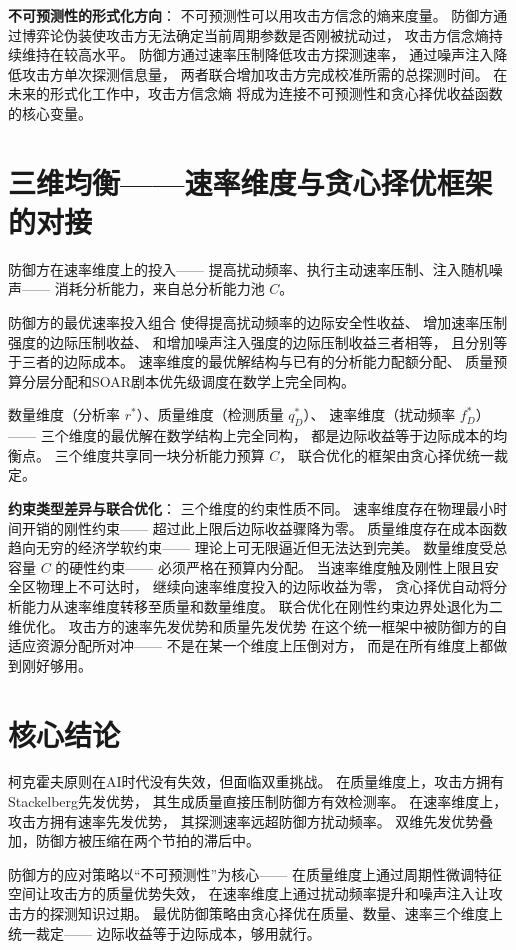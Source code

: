 \documentclass[11pt,a4paper]{article}
\begin{document}
\textbf{不可预测性的形式化方向}：
不可预测性可以用攻击方信念的熵来度量。
防御方通过博弈论伪装使攻击方无法确定当前周期参数是否刚被扰动过，
攻击方信念熵持续维持在较高水平。
防御方通过速率压制降低攻击方探测速率，
通过噪声注入降低攻击方单次探测信息量，
两者联合增加攻击方完成校准所需的总探测时间。
在未来的形式化工作中，攻击方信念熵
将成为连接不可预测性和贪心择优收益函数的核心变量。

\section{三维均衡——速率维度与贪心择优框架的对接}

防御方在速率维度上的投入——
提高扰动频率、执行主动速率压制、注入随机噪声——
消耗分析能力，来自总分析能力池 \(C\)。

防御方的最优速率投入组合
使得提高扰动频率的边际安全性收益、
增加速率压制强度的边际压制收益、
和增加噪声注入强度的边际压制收益三者相等，
且分别等于三者的边际成本。
速率维度的最优解结构与已有的分析能力配额分配、
质量预算分层分配和SOAR剧本优先级调度在数学上完全同构。

数量维度（分析率 \(r^*\)）、质量维度（检测质量 \(q_D^*\)）、
速率维度（扰动频率 \(f_D^*\)）——
三个维度的最优解在数学结构上完全同构，
都是边际收益等于边际成本的均衡点。
三个维度共享同一块分析能力预算 \(C\)，
联合优化的框架由贪心择优统一裁定。

\textbf{约束类型差异与联合优化}：
三个维度的约束性质不同。
速率维度存在物理最小时间开销的刚性约束——
超过此上限后边际收益骤降为零。
质量维度存在成本函数趋向无穷的经济学软约束——
理论上可无限逼近但无法达到完美。
数量维度受总容量 \(C\) 的硬性约束——
必须严格在预算内分配。
当速率维度触及刚性上限且安全区物理上不可达时，
继续向速率维度投入的边际收益为零，
贪心择优自动将分析能力从速率维度转移至质量和数量维度。
联合优化在刚性约束边界处退化为二维优化。
攻击方的速率先发优势和质量先发优势
在这个统一框架中被防御方的自适应资源分配所对冲——
不是在某一个维度上压倒对方，
而是在所有维度上都做到刚好够用。

\section{核心结论}

柯克霍夫原则在AI时代没有失效，但面临双重挑战。
在质量维度上，攻击方拥有Stackelberg先发优势，
其生成质量直接压制防御方有效检测率。
在速率维度上，攻击方拥有速率先发优势，
其探测速率远超防御方扰动频率。
双维先发优势叠加，防御方被压缩在两个节拍的滞后中。

防御方的应对策略以“不可预测性”为核心——
在质量维度上通过周期性微调特征空间让攻击方的质量优势失效，
在速率维度上通过扰动频率提升和噪声注入让攻击方的探测知识过期。
最优防御策略由贪心择优在质量、数量、速率三个维度上统一裁定——
边际收益等于边际成本，够用就行。
\end{document}
